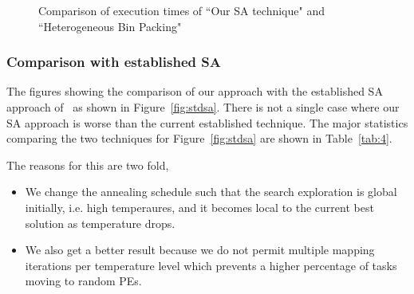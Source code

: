 \begin{figure}[t!]
{    \label{fig:gram1ho}
  }
  \caption{Comparison of execution times of ``Our SA technique" and
    ``Heterogeneous Bin Packing"}
  \label{fig:ho}
\end{figure}


\subsubsection{Comparison with established SA}
\label{sec:comp-with-establ}

The figures showing the comparison of our approach with the established
SA approach of~\cite{hors06} as shown in Figure~\ref{fig:stdsa}. There
is not a single case where our SA approach is worse than the current
established technique. The major statistics comparing the two techniques
for Figure~\ref{fig:stdsa} are shown in Table~\ref{tab:4}.

The reasons for this are two fold,
\begin{itemize}
\item We change the annealing schedule such that the search exploration is
global initially, i.e. high temperaures, and it becomes local to the current
best solution as temperature drops.
\item We also get a better result because we do not permit multiple mapping
iterations per temperature level which prevents a higher percentage of tasks
moving to random PEs. 
\end{itemize}

